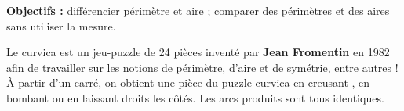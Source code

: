 \begin{changemargin}{-10mm}{-10mm}
\begin{activite}
    {\bf Objectifs :} différencier périmètre et aire ; comparer des périmètres et des aires sans utiliser la mesure.
 
    Le curvica est un jeu-puzzle de 24 pièces inventé par {\bf Jean Fromentin} en 1982 aﬁn de travailler sur les notions de périmètre, d’aire et de symétrie, entre autres ! À partir d’un carré, on obtient une pièce du puzzle curvica en \og creusant \fg, en \og bombant \fg ou en laissant droits les côtés. Les arcs produits sont tous identiques.
       
       \begin{center}
       \end{center}
       \vspace*{-10mm}
       

\end{activite}
\end{changemargin}
